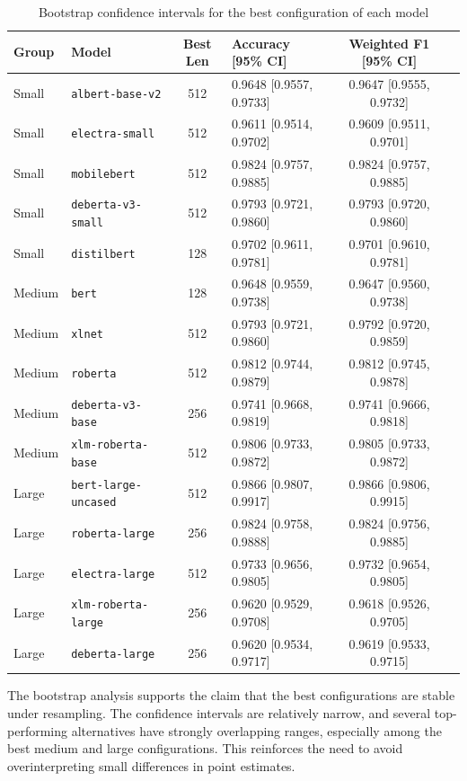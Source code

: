 \documentclass[11pt]{article}
\begin{document}
\begin{table}[H]
\centering
\caption{Bootstrap confidence intervals for the best configuration of each model}
\label{tab:bootstrap-summary}
\scriptsize
\begin{tabular}{llclcl}
\toprule
Group & Model & Best Len & Accuracy [95\% CI] & Weighted F1 [95\% CI] \\
\midrule
Small & \texttt{albert-base-v2} & 512 & 0.9648 [0.9557, 0.9733] & 0.9647 [0.9555, 0.9732] \\
Small & \texttt{electra-small} & 512 & 0.9611 [0.9514, 0.9702] & 0.9609 [0.9511, 0.9701] \\
Small & \texttt{mobilebert} & 512 & 0.9824 [0.9757, 0.9885] & 0.9824 [0.9757, 0.9885] \\
Small & \texttt{deberta-v3-small} & 512 & 0.9793 [0.9721, 0.9860] & 0.9793 [0.9720, 0.9860] \\
Small & \texttt{distilbert} & 128 & 0.9702 [0.9611, 0.9781] & 0.9701 [0.9610, 0.9781] \\
\midrule
Medium & \texttt{bert} & 128 & 0.9648 [0.9559, 0.9738] & 0.9647 [0.9560, 0.9738] \\
Medium & \texttt{xlnet} & 512 & 0.9793 [0.9721, 0.9860] & 0.9792 [0.9720, 0.9859] \\
Medium & \texttt{roberta} & 512 & 0.9812 [0.9744, 0.9879] & 0.9812 [0.9745, 0.9878] \\
Medium & \texttt{deberta-v3-base} & 256 & 0.9741 [0.9668, 0.9819] & 0.9741 [0.9666, 0.9818] \\
Medium & \texttt{xlm-roberta-base} & 512 & 0.9806 [0.9733, 0.9872] & 0.9805 [0.9733, 0.9872] \\
\midrule
Large & \texttt{bert-large-uncased} & 512 & 0.9866 [0.9807, 0.9917] & 0.9866 [0.9806, 0.9915] \\
Large & \texttt{roberta-large} & 256 & 0.9824 [0.9758, 0.9888] & 0.9824 [0.9756, 0.9885] \\
Large & \texttt{electra-large} & 512 & 0.9733 [0.9656, 0.9805] & 0.9732 [0.9654, 0.9805] \\
Large & \texttt{xlm-roberta-large} & 256 & 0.9620 [0.9529, 0.9708] & 0.9618 [0.9526, 0.9705] \\
Large & \texttt{deberta-large} & 256 & 0.9620 [0.9534, 0.9717] & 0.9619 [0.9533, 0.9715] \\
\bottomrule
\end{tabular}
\end{table}

The bootstrap analysis supports the claim that the best configurations are stable under resampling. The confidence intervals are relatively narrow, and several top-performing alternatives have strongly overlapping ranges, especially among the best medium and large configurations. This reinforces the need to avoid overinterpreting small differences in point estimates.
\end{document}
